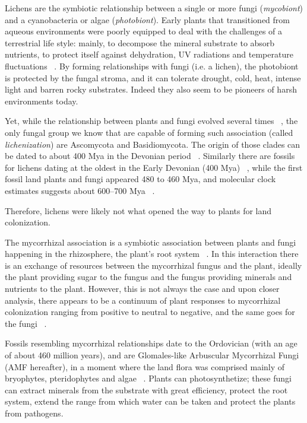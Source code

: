 Lichens are the symbiotic relationship between a single or more fungi (\emph{mycobiont}) and a cyanobacteria or algae (\emph{photobiont}). Early plants that transitioned from aqueous environments were poorly equipped to deal with the challenges of a terrestrial life style: mainly, to decompose the mineral substrate to absorb nutrients, to protect itself against dehydration, UV radiations and temperature fluctuations ~\citep{selosse1998, blackwell2000}. By forming relationships with fungi (i.e. a lichen), the photobiont is protected by the fungal stroma, and it can tolerate drought, cold, heat, intense light and barren rocky substrates. Indeed they also seem to be pioneers of harsh environments today.

Yet, while the relationship between plants and fungi evolved several times ~\citep{gargas1995}, the only fungal group we know that are capable of forming such association (called \emph{lichenization}) are Ascomycota and Basidiomycota. The origin of those clades can be dated to about 400 Mya in the Devonian period ~\citep{berbee1993}. Similarly there are fossils for lichens dating at the oldest in the Early Devonian (400 Mya) ~\citep{taylor1997, honegger2013}, while the first fossil land plants and fungi appeared 480 to 460 Mya, and molecular clock estimates suggests about 600--700 Mya ~\citep{berbee1993, heckman2001}.

Therefore, lichens were likely not what opened the way to plants for land colonization.

The mycorrhizal association is a symbiotic association between plants and fungi happening in the rhizosphere, the plant's root system ~\citep{barman2016}. In this interaction there is an exchange of resources between the mycorrhizal fungus and the plant, ideally the plant providing sugar to the fungus and the fungus providing minerals and nutrients to the plant. However, this is not always the case and upon closer analysis, there appears to be a continuum of plant responses to mycorrhizal colonization ranging from positive to neutral to negative, and the same goes for the fungi ~\citep{johnson1997}.

Fossils resembling mycorrhizal relationships date to the Ordovician (with an age of about 460 million years), and are Glomales-like Arbuscular Mycorrhizal Fungi (AMF hereafter), in a moment where the land flora was comprised mainly of bryophytes, pteridophytes and algae ~\citep{redecker2000}. Plants can photosynthetize; these fungi can extract minerals from the substrate with great efficiency, protect the root system, extend the range from which water can be taken and protect the plants from pathogens.

